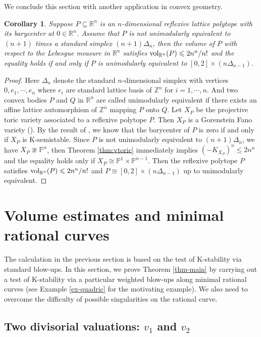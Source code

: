 \documentclass[12pt]{amsart}
\newtheorem{cor}[thm]{Corollary}
\theoremstyle{definition}
\def\vol{{\rm vol}}
\newcommand{\IP}{{\mathbb P}}
\newcommand{\IR}{{\mathbb R}}
\newcommand{\IZ}{{\mathbb Z}}
\newcommand{\lee}{\leqslant}
\begin{document}
We conclude this section with another application in convex geometry. 
\begin{cor}\label{cor:polytope}
    Suppose $P\subseteq \IR^n$ is an $n$-dimensional reflexive lattice polytope with its barycenter at $0\in\IR^n$. Assume that $P$ is not unimodularly equivalent to $(n+1)$ times a standard simplex $(n+1)\Delta_n$, then the volume of $P$ with respect to the Lebesgue measure in $\IR^n$ satisfies $\vol_{\IR^n}(P)\lee 2n^n/n!$ and the equality holds if and only if $P$ is unimodularly equivalent to $[0,2]\times (n\Delta_{n-1})$.
\end{cor}
\begin{proof}
    Here $\Delta_n$ denote the standard $n$-dimensional simplex with vertices $0, e_1,\cdots,e_n$ where $e_i$ are standard lattice basis of $\IZ^n$ for $i=1,\cdots,n$. And two convex bodies $P$ and $Q$ in $\IR^n$ are called unimodularly equivalent if there exists an affine lattice automorphism of $\IZ^n$ mapping $P$ onto $Q$. Let $X_{P}$ be the projective toric variety associated to a reflexive polytope $P$. Then $X_P$ is a Gorenstein Fano variety (\cite[Theorem 8.3.4]{CLS11}). By the result of \cite{WZ04,SZ12,BB13}, we know that the barycenter of $P$ is zero if and only if $X_P$ is K-semistable. Since $P$ is not unimodularly equivalent to $(n+1)\Delta_n$, we have $X_P\ncong \IP^n$, then Theorem \ref{thm:vtoric} immediately implies $(-K_{X_P})^n\lee 2n^n$ and the equality holds only if $X_P\cong \IP^1\times \IP^{n-1}$. Then the reflexive polytope $P$ satisfies $\vol_{\IR^n}(P)\lee 2n^n/n!$ and $P\cong [0,2]\times (n\Delta_{n-1})$ up to unimodularly equivalent.
\end{proof}



\section{Volume estimates and minimal rational curves}\label{sec-main}


The calculation in the previous section is based on the test of K-stability via standard blow-ups. In this section, we prove Theorem \ref{thm-main} by carrying out a test of K-stability via a particular weighted blow-ups along minimal rational curves (see Example \eqref{ex-quadric} for the motivating example).
We also need to overcome the difficulty of possible singularities on the rational curve.  


\subsection{Two divisorial valuations: $v_1$ and $v_2$ }\label{sub-coord}
\end{document}
